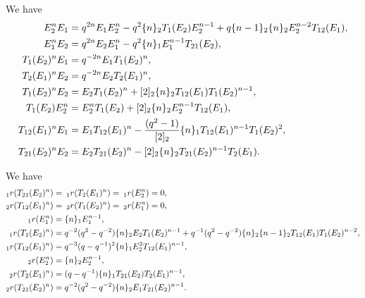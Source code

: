 \documentclass[a4 paper, 10pt]{article}
\begin{document}
\begin{lemma} \label{B2comm}
	We have
		\begin{align*}
			E_2^{ n } E_1  			&=  q^{ 2n } E_1 E_2^{ n } - q^{ 2 } \{ n \}_{2} T_{1}(E_2) E_2^{ n-1 } + q \{ n-1 \}_{2} \{ n \}_2 E_2^{n-2} T_{12}(E_1), \\
			E_1^{ n } E_2			&=	q^{ 2n } E_2 E_1^{ n } - q^{ 2 } \{ n \}_{1} E_1^{ n-1 } T_{21}(E_2), \\
			T_{1}(E_2)^{ n } E_1		&=	q^{ -2n } E_1 T_{1}(E_2)^{ n }, \\
			T_{2}(E_1)^{ n } E_2		&=	q^{ -2n } E_2 T_{2}(E_1)^{ n }, \\
			T_{1}(E_2)^{ n } E_2		&=	E_2 T_{1}(E_2)^{ n } + [ 2 ]_{2} \{ n \}_{2} T_{12}(E_1) T_{1}(E_2)^{ n-1 }, \\
			T_{1}(E_2) E_2^{ n }		&=	E_2^{ n } T_{1}(E_2) + [ 2 ]_{2} \{ n \}_{2} E_2^{ n-1 } T_{12}(E_1), \\
			T_{12}(E_1)^{ n } E_1	&=	E_1 T_{12}(E_1)^{ n } - \frac{(q^2 - 1)}{ [ 2 ]_{2} } \{ n \}_{1} T_{12}(E_1)^{ n-1 } T_{1}(E_2)^{ 2 }, \\
			T_{21}(E_2)^{ n } E_2	&=	E_2 T_{21}(E_2)^{ n } - [ 2 ]_{2} \{ n \}_{2} T_{21}(E_2)^{ n-1 } T_{2}(E_1).
		\end{align*}
\end{lemma}

\begin{lemma} \label{B2skew}
	We have
		\begin{align*}
			{}_{ 1 }r( T_{21}(E_2)^{ n } ) 	&=	\: {}_{ 1 }r( T_{2}(E_1)^{ n } ) = \: {}_{ 1 }r( E_2^{ n } ) = 0, \\
			{}_{ 2 }r( T_{12}(E_1)^{ n } ) 	&=	\: {}_{ 2 }r( T_{1}(E_2)^{ n } ) = \: {}_{ 2 }r( E_1^{ n } ) = 0, \\
			{}_{ 1 }r( E_1^{ n } )			&=	\{ n \}_{1} E_1^{ n-1 }, \\
			{}_{ 1 }r( T_{1}(E_2)^{ n } )		&=	q^{ -2 }( q^{ 2 } - q^{ -2 } ) \{ n \}_{2} E_2 T_{1}(E_2)^{ n-1 } + q^{ -1 }( q^{ 2 } - q^{ -2 } ) \{ n \}_{2} \{ n-1 \}_{2} T_{12}(E_1) T_{1}(E_2)^{ n-2 }, \\
			{}_{ 1 }r( T_{12}(E_1)^{ n } )	&=	q^{ -3 }( q - q^{ -1 } )^{ 2 } \{ n \}_{1} E_2^{ 2 } T_{12}(E_1)^{ n-1 }, \\
			{}_{ 2 }r( E_2^{ n } )			&=	\{ n \}_{2} E_2^{ n-1 }, \\
			{}_{ 2 }r( T_{2}(E_1)^{ n } )		&=	( q - q^{ -1 } ) \{ n \}_{1} T_{21}(E_2) T_{2}(E_1)^{ n-1 } , \\
			{}_{ 2 }r( T_{21}(E_2)^{ n } )	&=	q^{ -2 }( q^{ 2 } - q^{ -2 } ) \{ n \}_{2} E_1 T_{21}(E_2)^{ n-1 }.
		\end{align*}
\end{lemma}
\end{document}
